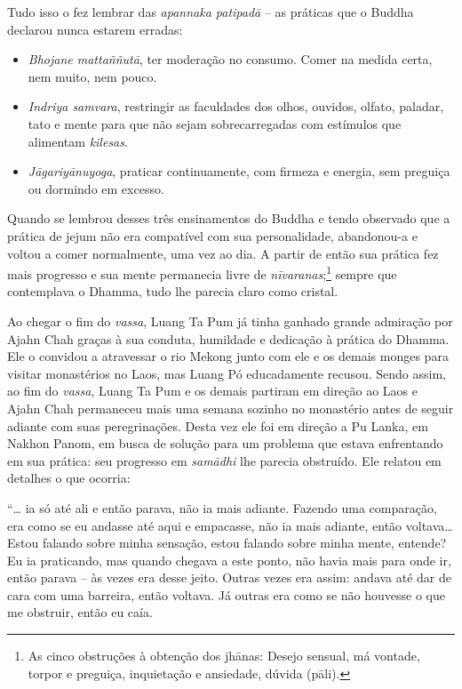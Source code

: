 Tudo isso o fez lembrar das \emph{apannaka patipadā} -- as práticas que
o Buddha declarou nunca estarem erradas:

\begin{itemize}
\item
  \emph{Bhojane mattaññutā}, ter moderação no consumo. Comer na medida
  certa, nem muito, nem pouco.
\item
  \emph{Indriya samvara}, restringir as faculdades dos olhos, ouvidos,
  olfato, paladar, tato e mente para que não sejam sobrecarregadas com
  estímulos que alimentam \emph{kilesas}.
\item
  \emph{Jāgariyānuyoga}, praticar continuamente, com firmeza e energia,
  sem preguiça ou dormindo em excesso.
\end{itemize}

Quando se lembrou desses três ensinamentos do Buddha e tendo observado
que a prática de jejum não era compatível com sua personalidade,
abandonou-a e voltou a comer normalmente, uma vez ao dia. A partir de
então sua prática fez mais progresso e sua mente permanecia livre de
\emph{nīvaranas};\footnote{As cinco obstruções à obtenção dos jhānas:
  Desejo sensual, má vontade, torpor e preguiça, inquietação e
  ansiedade, dúvida (pāli).} sempre que contemplava o Dhamma, tudo lhe
parecia claro como cristal.

Ao chegar o fim do \emph{vassa}, Luang Ta Pum já tinha ganhado grande
admiração por Ajahn Chah graças à sua conduta, humildade e dedicação à
prática do Dhamma. Ele o convidou a atravessar o rio Mekong junto com
ele e os demais monges para visitar monastérios no Laos, mas Luang Pó
educadamente recusou. Sendo assim, ao fim do \emph{vassa}, Luang Ta Pum
e os demais partiram em direção ao Laos e Ajahn Chah permaneceu mais uma
semana sozinho no monastério antes de seguir adiante com suas
peregrinações. Desta vez ele foi em direção a Pu Lanka, em Nakhon Panom,
em busca de solução para um problema que estava enfrentando em sua
prática: seu progresso em \emph{samādhi} lhe parecia obstruído. Ele
relatou em detalhes o que ocorria:

``\ldots{} ia só até ali e então parava, não ia mais adiante. Fazendo
uma comparação, era como se eu andasse até aqui e empacasse, não ia mais
adiante, então voltava\ldots{} Estou falando sobre minha sensação, estou
falando sobre minha mente, entende? Eu ia praticando, mas quando chegava
a este ponto, não havia mais para onde ir, então parava -- às vezes era
desse jeito. Outras vezes era assim: andava até dar de cara com uma
barreira, então voltava. Já outras era como se não houvesse o que me
obstruir, então eu caía.

